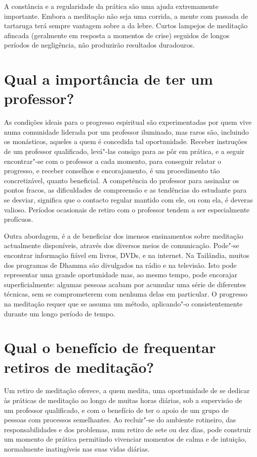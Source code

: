 A constância e a regularidade da prática são uma ajuda extremamente
importante. Embora a meditação não seja uma corrida, a mente com passada
de tartaruga terá sempre vantagem sobre a da lebre. Curtos lampejos de
meditação afincada (geralmente em resposta a momentos de crise) seguidos
de longos períodos de negligência, não produzirão resultados duradouros.

\section{Qual a importância de ter um professor?}

As condições ideais para o progresso espiritual são experimentadas por
quem vive numa comunidade liderada por um professor iluminado, mas raros
são, incluindo os monásticos, aqueles a quem é concedida tal
oportunidade. Receber instruções de um professor qualificado, levá"-las
consigo para as pôr em prática, e a seguir encontrar"-se com o professor
a cada momento, para conseguir relatar o progresso, e receber conselhos
e encorajamento, é um procedimento tão concretizável, quanto beneficial.
A competência do professor para assinalar os pontos fracos, as
dificuldades de compreensão e as tendências do estudante para se
desviar, significa que o contacto regular mantido com ele, ou com ela, é
deveras valioso. Períodos ocasionais de retiro com o professor tendem a
ser especialmente profícuos.

Outra abordagem, é a de beneficiar dos imensos ensinamentos sobre
meditação actualmente disponíveis, através dos diversos meios de
comunicação. Pode"-se encontrar informação fiável em livros, DVDs, e na
internet. Na Tailândia, muitos dos programas de Dhamma são divulgados na
rádio e na televisão. Isto pode representar uma grande oportunidade mas,
ao mesmo tempo, pode encorajar superficialmente: algumas pessoas acabam
por acumular uma série de diferentes técnicas, sem se comprometerem com
nenhuma delas em particular. O progresso na meditação requer que se
assuma um método, aplicando"-o consistentemente durante um longo período
de tempo.

\section{Qual o benefício de frequentar retiros de meditação?}

Um retiro de meditação oferece, a quem medita, uma oportunidade de se
dedicar às práticas de meditação ao longo de muitas horas diárias, sob a
supervisão de um professor qualificado, e com o benefício de ter o apoio
de um grupo de pessoas com processos semelhantes. Ao recluir"-se do
ambiente rotineiro, das responsabilidades e dos problemas, num retiro de
sete ou dez dias, pode construir um momento de prática permitindo
vivenciar momentos de calma e de intuição, normalmente inatingíveis nas
suas vidas diárias.

